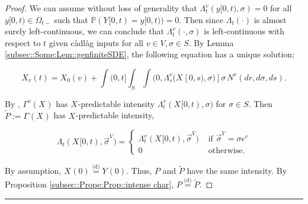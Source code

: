 \documentclass[12pt]{article}
\newcommand{\mb}{\mathbb}
\newcommand{\te}{\text}
\newcommand{\ep}{\epsilon}
\newcommand{\lin}{\rule{\linewidth}{0.4 pt}}
\newcommand{\pr}{\mb{P}}							%
\newcommand{\deq}{\overset{\text{(d)}}{=}}			%
\newcommand{\defeq}{:=}								%
\renewcommand{\v}{v}							%
\renewcommand{\S}{S}							%
\newcommand{\s}{\sigma}							%
\newcommand{\sv}{\vec{\s}}						%
\newcommand{\ev}{\ep}							%
\renewcommand{\t}{t}							%
\newcommand{\sset}{\Omega}						%
\renewcommand{\tt}{s}							%
\newcommand{\X}{X}								%
\newcommand{\vind}[1]{^{#1}}					%
\newcommand{\vsi}[1]{^{#1}}						%
\newcommand{\cind}[1]{_{#1}}					%
\newcommand{\tp}[1]{(#1)}						%
\newcommand{\tip}[1]{#1}						%
\newcommand{\ts}[1]{_{#1}}						%
\newcommand{\poiss}{N}							%
\renewcommand{\r}{r}							%
\newcommand{\alt}[1]{\widetilde{#1}}			%
\newcommand{\XX}{Y}								%
\newcommand{\pmap}{\Gamma}						%
\newcommand{\rp}{P}								%
\newcommand{\ratee}{\Lambda}					%
\newcommand{\xx}{y}								%
\begin{document}
\begin{proof}

We can assume without loss of generality that \(\ratee\ts{\t}\vind{\v}(\xx{}{[0,\t)},\s) = 0\) for all \(\xx{}{[0,\t)}\in \sset\vsi{}\ts{\t-}\) such that \(\pr(\XX\cind{}\tip{[0,\t)} = \xx{}{[0,\t)}) = 0\). Then since \(\ratee\ts{\t}(\cdot)\) is almost surely left-continuous, we can conclude that \(\ratee\ts{\t}\vind{\v}(\cdot,\s)\) is left-continuous with respect to \(\t\) given c\`adl\`ag inputs for all \(\v\in V,\s\in\S\). By Lemma \ref{subsec::Some:Lem::genfiniteSDE}, the following equation has a unique solution:

\[\X\cind{\v}\tp{\t} = \X\cind{0}\tp{\v} + \int{(0,\t]}\int_\S\int{(0,\ratee\ts{\tt}\vind{\v}(\X\cind{}\tip{[0,\tt)},\s)]}  \s\,\poiss\vind{\v}(d\r,d\s,d\tt).\]

By \cite[Exercise 14.7.1]{DalVer08}, \(\pmap\vind{\v}(\X\cind{}\tip{})\) has \(\X\cind{}\tip{}\)-predictable intensity \(\ratee\ts{\t}\vind{\v}(\X\cind{}\tip{[0,\t)},\s)\) for \(\s \in \S\). Then \(\alt{\rp{}} \defeq \pmap\vind{}(\X\cind{}\tip{})\) has \(\X\cind{}\tip{}\)-predictable intensity,

\[\ratee\ts{\t}(\X\cind{}\tip{[0,\t)},\sv\cind{}\vsi{V}) = \begin{cases}
\ratee\ts{\t}\vind{\v}(\X\cind{}\tip{[0,\t)},\sv\cind{}\vsi{V}) &\te{ if } \sv\cind{}\vsi{V} = \s\ev\vind{\v}\\
0&\te{ otherwise.}
\end{cases}\]

By assumption, \(\X\cind{}\tp{0} \deq \XX\cind{}\tp{0}\). Thus, \(\rp{}\) and \(\alt{\rp{}}\) have the same intensity. By Proposition \ref{subsec::Prope:Prop::intense char}, \(\rp{} \deq \alt{\rp{}}\).
\end{proof}
\lin
\end{document}
